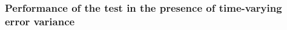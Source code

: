 \documentclass[12pt]{article}
\begin{document}
\subsubsection{Performance of the test in the presence of time-varying error variance}\label{subsec:sim:SV}




% 


% 
% 
% 


% 
% 
% 
\end{document}
